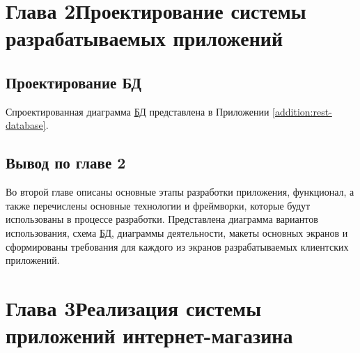\documentclass[14pt,a4paper]{scrartcl}
\begin{document}
    \pagestyle{empty}

    

    

    \clearpage
    \tableofcontents\thispagestyle{empty}

    
    \pagestyle{plain}
    
    
    
    \section[Глава 2 Проектирование системы разрабатываемых приложений]{Глава 2\break Проектирование системы разрабатываемых приложений}
    \label{sec:charpter-2-designing}

    
    
    
    

    \subsection{Проектирование БД}\label{subsec:design-db}\indent

    Спроектированная диаграмма \hyperlink{gloss:db}{БД} представлена в Приложении \ref{addition:rest-database}.

    
    
    
    

    \subsection{Вывод по главе 2}\label{subsec:2-conclusion}\indent

    Во второй главе описаны основные этапы разработки приложения, функционал, 
    а также перечислены основные технологии и фреймворки, которые будут использованы в процессе разработки. Представлена диаграмма вариантов использования, 
    схема \hyperlink{gloss:db}{БД}, диаграммы деятельности, макеты основных экранов и сформированы требования для каждого из экранов разрабатываемых клиентских приложений.

    \section[Глава 3 Реализация системы приложений интернет-магазина]{Глава 3\break Реализация системы приложений интернет-магазина}
    \label{sec:charpter-3-inplementation}
\end{document}
